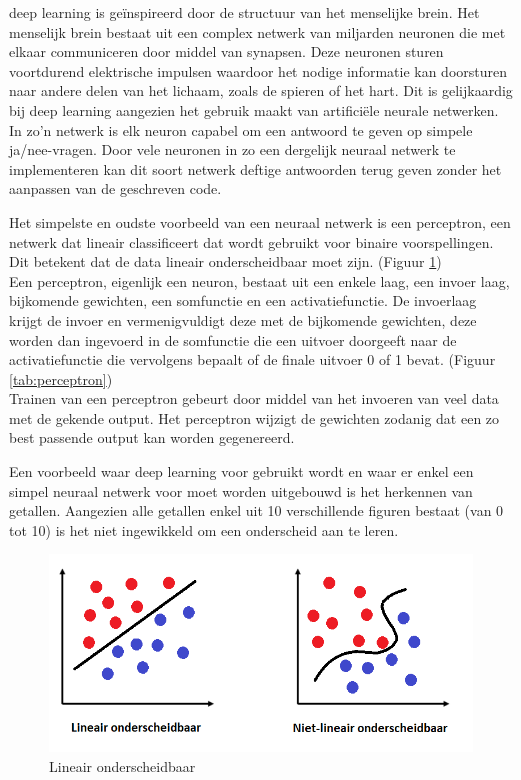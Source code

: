 deep learning is geïnspireerd door de structuur van het menselijke brein. Het menselijk brein bestaat uit een complex netwerk van miljarden neuronen die met elkaar communiceren door middel van synapsen.
Deze neuronen sturen voortdurend elektrische impulsen waardoor het nodige informatie kan doorsturen naar andere delen van het lichaam, zoals de spieren of het hart.
Dit is gelijkaardig bij deep learning aangezien het gebruik maakt van artificiële neurale netwerken. In zo'n netwerk is elk neuron capabel om een antwoord te geven op simpele ja/nee-vragen. Door vele neuronen in zo een dergelijk neuraal netwerk te implementeren kan dit soort netwerk deftige antwoorden terug geven zonder het aanpassen van de geschreven code.

Het simpelste en oudste voorbeeld van een neuraal netwerk is een perceptron, een netwerk dat lineair classificeert dat wordt gebruikt voor binaire voorspellingen. Dit betekent dat de data lineair onderscheidbaar moet zijn. (Figuur \ref{tab:lineair})\\
Een perceptron, eigenlijk een neuron, bestaat uit een enkele laag, een invoer laag, bijkomende gewichten, een somfunctie en een activatiefunctie.
De invoerlaag krijgt de invoer en vermenigvuldigt deze met de bijkomende gewichten, deze worden dan ingevoerd in de somfunctie die een uitvoer doorgeeft naar de activatiefunctie die vervolgens bepaalt of de finale uitvoer 0 of 1 bevat. (Figuur \ref{tab:perceptron})\\
Trainen van een perceptron gebeurt door middel van het invoeren van veel data met de gekende output. Het perceptron wijzigt de gewichten zodanig dat een zo best passende output kan worden gegenereerd.

Een voorbeeld waar deep learning voor gebruikt wordt en waar er enkel een simpel neuraal netwerk voor moet worden uitgebouwd is het herkennen van getallen.
Aangezien alle getallen enkel uit 10 verschillende figuren bestaat (van 0 tot 10) is het niet ingewikkeld om een onderscheid aan te leren. \autocite{Dann2010}


\begin{figure}
	
	
	\includegraphics[width=\linewidth]{img/Lineair_onderscheidbaar.png}
	\caption{Lineair onderscheidbaar}
    \label{tab:lineair}
	
\end{figure}


